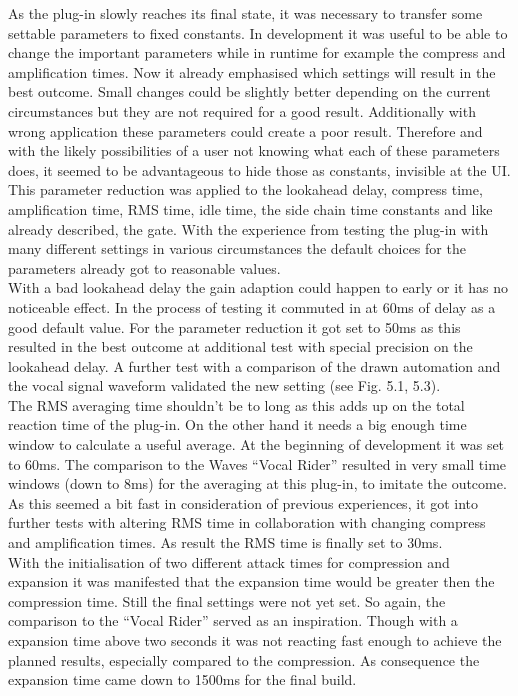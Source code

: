 As the plug-in slowly reaches its final state, it was necessary to transfer some settable parameters to fixed constants. In development it was useful to be able to change the important parameters while in runtime for example the compress and amplification times. Now it already emphasised which settings will  result in the best outcome. Small changes could be slightly better depending on the current circumstances but they are not required for a good result. Additionally with wrong application these parameters could create a poor result. Therefore and with the likely possibilities of a user not knowing what each of these parameters does, it seemed to be advantageous to hide those as constants, invisible at the UI.\\
This parameter reduction was applied to the lookahead delay, compress time, amplification time, RMS time, idle time, the side chain time constants and like already described, the gate. With the experience from testing the plug-in with many different settings in various circumstances the default choices for the parameters already got to reasonable values.\\
With a bad lookahead delay the gain adaption could happen to early or it has no noticeable effect. In the process of testing it commuted in at 60ms of delay as a good default value. For the parameter reduction it got set to 50ms as this resulted in the best outcome at additional test with special precision on the lookahead delay. A further test with a comparison of the drawn automation and the vocal signal waveform validated the new setting (see Fig. 5.1, 5.3).\\
The RMS averaging time shouldn’t be to long as this adds up on the total reaction time of the plug-in. On the other hand it needs a big enough time window to calculate a useful average. At the beginning of development it was set to 60ms. The comparison to the Waves “Vocal Rider” resulted in very small time windows (down to 8ms) for the averaging at this plug-in, to imitate the outcome. As this seemed a bit fast in consideration of previous experiences, it got into further tests with altering RMS time in collaboration with changing compress and amplification times. As result the RMS time is finally set to 30ms.\\
With the initialisation of two different attack times for compression and expansion it was manifested that the expansion time would be greater then the compression time. Still the final settings were not yet set. So again, the comparison to the “Vocal Rider” served as an inspiration. Though with a expansion time above two seconds it was not reacting fast enough to achieve the planned results, especially compared to the compression. As consequence the expansion time came down to 1500ms for the final build.\\
